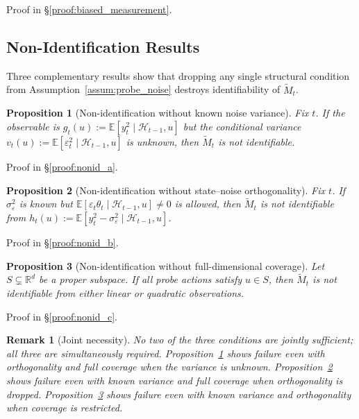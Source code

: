 \documentclass{article}
\newcommand{\R}{\mathbb{R}}
\newcommand{\E}{\mathbb{E}}
\newcommand{\cH}{\mathcal{H}}
\newtheorem{proposition}{Proposition}
\newtheorem{remark}{Remark}
\begin{document}
Proof in \S\ref{proof:biased_measurement}.

\subsection{Non-Identification Results}

Three complementary results show that dropping any single structural condition from Assumption~\ref{assum:probe_noise} destroys identifiability of $\widetilde{M}_t$.

\begin{proposition}[Non-identification without known noise variance]
  \label{prop:nonid_a}
  Fix $t$. If the observable is $g_t(u) := \E[y_t^2 \mid \cH_{t-1}, u]$ but the conditional variance $v_t(u) := \E[\varepsilon_t^2 \mid \cH_{t-1}, u]$ is unknown, then $\widetilde{M}_t$ is not identifiable.
\end{proposition}

Proof in \S\ref{proof:nonid_a}.

\begin{proposition}[Non-identification without state--noise orthogonality]
  \label{prop:nonid_b}
  Fix $t$. If $\sigma_\varepsilon^2$ is known but $\E[\varepsilon_t \theta_t \mid \cH_{t-1}, u] \neq 0$ is allowed, then $\widetilde{M}_t$ is not identifiable from $h_t(u) := \E[y_t^2 - \sigma_\varepsilon^2 \mid \cH_{t-1}, u]$.
\end{proposition}

Proof in \S\ref{proof:nonid_b}.

\begin{proposition}[Non-identification without full-dimensional coverage]
  \label{prop:nonid_c}
  Let $S \subsetneq \R^d$ be a proper subspace.  If all probe actions satisfy $u \in S$, then $\widetilde{M}_t$ is not identifiable from either linear or quadratic observations.
\end{proposition}

Proof in \S\ref{proof:nonid_c}.

\begin{remark}[Joint necessity]
\label{rem:joint_necessity}
No two of the three conditions are jointly sufficient; all three are simultaneously required.
Proposition~\ref{prop:nonid_a} shows failure even with orthogonality and full coverage when the variance is unknown.
Proposition~\ref{prop:nonid_b} shows failure even with known variance and full coverage when orthogonality is dropped.
Proposition~\ref{prop:nonid_c} shows failure even with known variance and orthogonality when coverage is restricted.
\end{remark}
\end{document}
